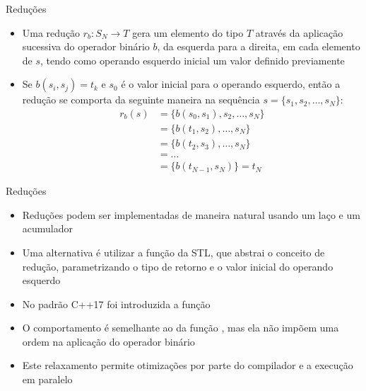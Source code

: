 \begin{frame}[fragile]{Reduções}

    \begin{itemize}
        \item Uma redução $r_b : S_N \to T$ gera um elemento do tipo $T$ através da aplicação 
            sucessiva do operador binário $b$, da esquerda para a direita, em cada elemento de $s$, 
            tendo como operando esquerdo inicial um valor definido previamente
        \pause

        \item Se $b(s_i, s_j) = t_k$ e $s_0$ é o valor inicial para o operando esquerdo, 
            então a redução se comporta da seguinte maneira na sequência $s = \lbrace s_1, s_2,
                \ldots, s_N\rbrace$:
        \begin{align*}
            r_b(s) &= \lbrace b(s_0, s_1), s_2, \ldots, s_N\rbrace \\ 
            &= \lbrace b(t_1, s_2), \ldots, s_N\rbrace \\
            &= \lbrace b(t_2, s_3), \ldots, s_N\rbrace \\
            &= \ldots \\
            &= \lbrace b(t_{N-1}, s_N) \rbrace = t_N
        \end{align*}

    \end{itemize}

\end{frame}

\begin{frame}[fragile]{Reduções}

    \begin{itemize}
        \item Reduções podem ser implementadas de maneira natural usando um laço e um 
            acumulador
        \pause

        \item Uma alternativa é utilizar a função  da STL, que
            abstrai o conceito de redução, parametrizando o tipo de retorno e o valor
            inicial do operando esquerdo
        \pause

        \item No padrão C++17 foi introduzida a função 
        \pause

        \item O comportamento é semelhante ao da função , mas ela
            não impõem uma ordem na aplicação do operador binário
        \pause

        \item Este relaxamento permite otimizações por parte do compilador e a execução
            em paralelo
    \end{itemize}

\end{frame}

